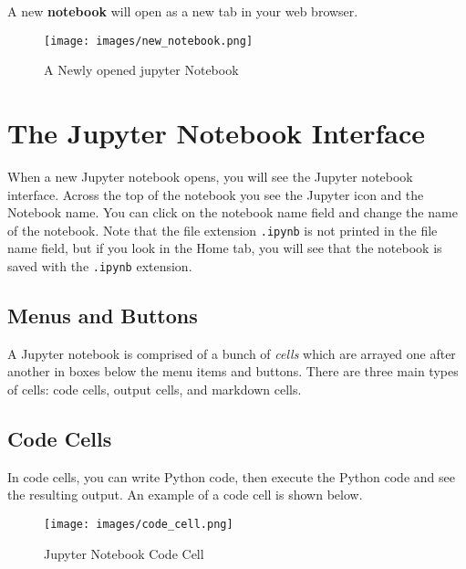 \documentclass{book}
\makeatletter
\def\maxwidth{\ifdim\Gin@nat@width>\linewidth\linewidth
\else\Gin@nat@width\fi}
\let\Oldincludegraphics\includegraphics
\renewcommand{\includegraphics}[1]{\Oldincludegraphics[width=.8\maxwidth]{#1}}
\newcommand{\passthrough}[1]{#1}
\makeatother
\begin{document}
A new \textbf{notebook} will open as a new tab in your web browser.

\begin{figure}
\centering
\texttt{[image: images/new\_notebook.png]}
\caption{A Newly opened jupyter Notebook}
\end{figure}
    




    
        \hypertarget{the-jupyter-notebook-interface}{%
\section{The Jupyter Notebook
Interface}\label{the-jupyter-notebook-interface}}
    




    
        When a new Jupyter notebook opens, you will see the Jupyter notebook
interface. Across the top of the notebook you see the Jupyter icon and
the Notebook name. You can click on the notebook name field and change
the name of the notebook. Note that the file extension
\passthrough{\lstinline!.ipynb!} is not printed in the file name field,
but if you look in the Home tab, you will see that the notebook is saved
with the \passthrough{\lstinline!.ipynb!} extension.
    




    
        \hypertarget{menus-and-buttons}{%
\subsection{Menus and Buttons}\label{menus-and-buttons}}

A Jupyter notebook is comprised of a bunch of \emph{cells} which are
arrayed one after another in boxes below the menu items and buttons.
There are three main types of cells: code cells, output cells, and
markdown cells.
    




    
        \hypertarget{code-cells}{%
\subsection{Code Cells}\label{code-cells}}

In code cells, you can write Python code, then execute the Python code
and see the resulting output. An example of a code cell is shown below.

\begin{figure}
\centering
\texttt{[image: images/code\_cell.png]}
\caption{Jupyter Notebook Code Cell}
\end{figure}
\end{document}
